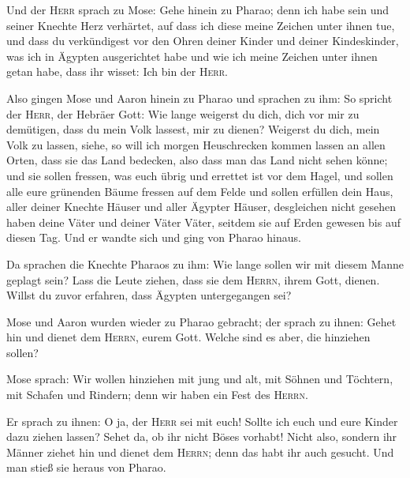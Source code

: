  Und der \textsc{Herr} sprach zu Mose: Gehe hinein zu
Pharao; denn ich habe sein und seiner Knechte Herz verhärtet, auf dass
ich diese meine Zeichen unter ihnen tue,  und dass du
verkündigest vor den Ohren deiner Kinder und deiner Kindeskinder, was
ich in Ägypten ausgerichtet habe und wie ich meine Zeichen unter ihnen
getan habe, dass ihr wisset: Ich bin der \textsc{Herr}.

 Also gingen Mose und Aaron hinein zu Pharao und sprachen
zu ihm: So spricht der \textsc{Herr}, der Hebräer Gott: Wie lange
weigerst du dich, dich vor mir zu demütigen, dass du mein Volk lassest,
mir zu dienen?  Weigerst du dich, mein Volk zu lassen,
siehe, so will ich morgen Heuschrecken kommen lassen an allen Orten,
 dass sie das Land bedecken, also dass man das Land nicht
sehen könne; und sie sollen fressen, was euch übrig und errettet ist vor
dem Hagel, und sollen alle eure grünenden Bäume fressen auf dem Felde
 und sollen erfüllen dein Haus, aller deiner Knechte
Häuser und aller Ägypter Häuser, desgleichen nicht gesehen haben deine
Väter und deiner Väter Väter, seitdem sie auf Erden gewesen bis auf
diesen Tag. Und er wandte sich und ging von Pharao hinaus.

 Da sprachen die Knechte Pharaos zu ihm: Wie lange sollen
wir mit diesem Manne geplagt sein? Lass die Leute ziehen, dass sie dem
\textsc{Herrn}, ihrem Gott, dienen. Willst du zuvor erfahren, dass
Ägypten untergegangen sei?

 Mose und Aaron wurden wieder zu Pharao gebracht; der
sprach zu ihnen: Gehet hin und dienet dem \textsc{Herrn}, eurem Gott.
Welche sind es aber, die hinziehen sollen?

 Mose sprach: Wir wollen hinziehen mit jung und alt, mit
Söhnen und Töchtern, mit Schafen und Rindern; denn wir haben ein Fest
des \textsc{Herrn}.

 Er sprach zu ihnen: O ja, der \textsc{Herr} sei mit
euch! Sollte ich euch und eure Kinder dazu ziehen lassen? Sehet da, ob
ihr nicht Böses vorhabt!  Nicht also, sondern ihr Männer
ziehet hin und dienet dem \textsc{Herrn}; denn das habt ihr auch
gesucht. Und man stieß sie heraus von Pharao.

